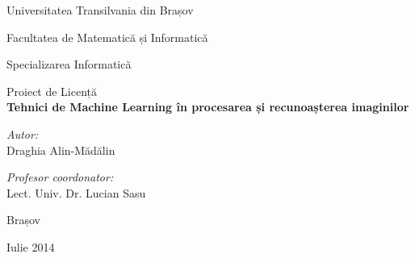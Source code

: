 \pagestyle{empty}

\begin{titlepage}

\begin{center}

\Large Universitatea Transilvania din Brașov

\Large Facultatea de Matematică și Informatică

\large Specializarea Informatică

\vfill
\Large Proiect de Licență\\[0.3cm]
 
{ \Huge \bfseries Tehnici de Machine Learning în procesarea și recunoașterea imaginilor}\\[2cm]
 
\begin{minipage}{0.4\textwidth}
\begin{flushleft} \large
\emph{Autor:}\\
Draghia Alin-Mădălin
\end{flushleft}
\end{minipage}
\begin{minipage}{0.5\textwidth}
\begin{flushright} \large
\emph{Profesor coordonator:} \\
Lect. Univ. Dr. Lucian Sasu
\end{flushright}
\end{minipage}
 
\vfill

{\Large Brașov}

{\large Iulie 2014}
 
\end{center}
 
\end{titlepage}
\pagestyle{fancy}